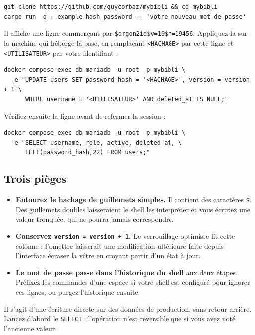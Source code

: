 \begin{lstlisting}
git clone https://github.com/guycorbaz/mybibli && cd mybibli
cargo run -q --example hash_password -- 'votre nouveau mot de passe'
\end{lstlisting}

Il affiche une ligne commençant par \texttt{\$argon2id\$v=19\$m=19456}.
Appliquez-la sur la machine qui héberge la base, en remplaçant
\texttt{<HACHAGE>} par cette ligne et \texttt{<UTILISATEUR>} par votre
identifiant :

\begin{lstlisting}
docker compose exec db mariadb -u root -p mybibli \
  -e "UPDATE users SET password_hash = '<HACHAGE>', version = version + 1 \
      WHERE username = '<UTILISATEUR>' AND deleted_at IS NULL;"
\end{lstlisting}

Vérifiez ensuite la ligne avant de refermer la session :

\begin{lstlisting}
docker compose exec db mariadb -u root -p mybibli \
  -e "SELECT username, role, active, deleted_at, \
      LEFT(password_hash,22) FROM users;"
\end{lstlisting}

\subsection*{Trois pièges}

\begin{itemize}
  \item \textbf{Entourez le hachage de guillemets simples.} Il contient
        des caractères \texttt{\$}. Des guillemets doubles laisseraient
        le shell les interpréter et vous écririez une valeur tronquée,
        qui ne pourra jamais correspondre.
  \item \textbf{Conservez \texttt{version = version + 1}.} Le
        verrouillage optimiste lit cette colonne ; l'omettre laisserait
        une modification ultérieure faite depuis l'interface écraser la
        vôtre en croyant partir d'un état à jour.
  \item \textbf{Le mot de passe passe dans l'historique du shell} aux
        deux étapes. Préfixez les commandes d'une espace si votre shell
        est configuré pour ignorer ces lignes, ou purgez l'historique
        ensuite.
\end{itemize}

Il s'agit d'une écriture directe sur des données de production, sans
retour arrière. Lancez d'abord le \texttt{SELECT} : l'opération n'est
réversible que si vous avez noté l'ancienne valeur.

